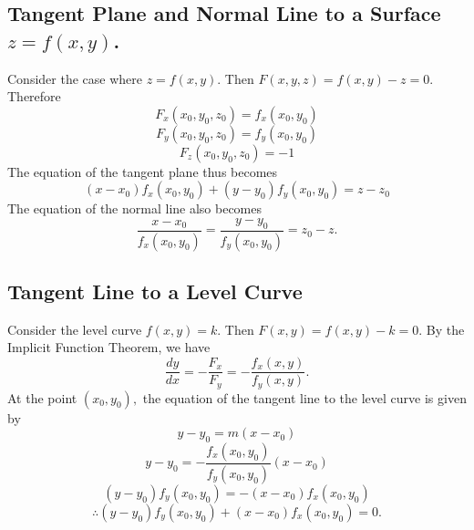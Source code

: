 \documentclass{article}
\begin{document}
\subsection{Tangent Plane and Normal Line to a Surface $z=f(x,y)$.}
Consider the case where $z=f(x,y).$ Then $F(x,y,z)=f(x,y)-z=0.$ Therefore
$$F_x(x_0,y_0,z_0)=f_x(x_0,y_0)$$
$$F_y(x_0,y_0,z_0)=f_y(x_0,y_0)$$
$$F_z(x_0,y_0,z_0)=-1$$
The equation of the tangent plane thus becomes
$$(x-x_0)f_x(x_0,y_0)+(y-y_0)f_y(x_0,y_0)=z-z_0$$
The equation of the normal line also becomes
$$\frac{x-x_0}{f_x(x_0,y_0)}=\frac{y-y_0}{f_y(x_0,y_0)}=z_0-z.$$
\subsection{Tangent Line to a Level Curve}
Consider the level curve $f(x,y)=k$. Then $F(x,y)=f(x,y)-k=0.$ By the Implicit Function Theorem, we have
$$\frac{dy}{dx}=-\frac{F_x}{F_y}=-\frac{f_x(x,y)}{f_y(x,y)}.$$
At the point $(x_0,y_0),$ the equation of the tangent line to the level curve is given by 
$$y-y_0=m(x-x_0)$$
$$y-y_0=-\frac{f_x(x_0,y_0)}{f_y(x_0,y_0)}(x-x_0)$$
$$(y-y_0)f_y(x_0,y_0)=-(x-x_0)f_x(x_0,y_0)$$
$$\therefore(y-y_0)f_y(x_0,y_0)+(x-x_0)f_x(x_0,y_0)=0.$$
\end{document}
